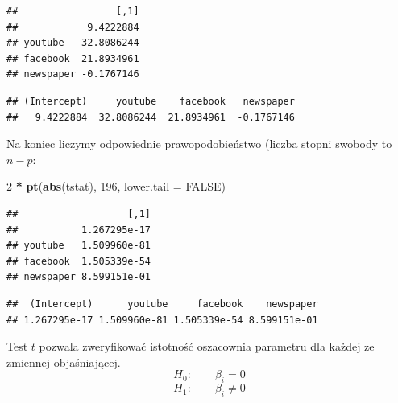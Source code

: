 \documentclass[]{article}
\newenvironment{Shaded}{\begin{snugshade}}{\end{snugshade}}
\newcommand{\KeywordTok}[1]{\textcolor[rgb]{0.13,0.29,0.53}{\textbf{#1}}}
\newcommand{\DataTypeTok}[1]{\textcolor[rgb]{0.13,0.29,0.53}{#1}}
\newcommand{\DecValTok}[1]{\textcolor[rgb]{0.00,0.00,0.81}{#1}}
\newcommand{\StringTok}[1]{\textcolor[rgb]{0.31,0.60,0.02}{#1}}
\newcommand{\OtherTok}[1]{\textcolor[rgb]{0.56,0.35,0.01}{#1}}
\newcommand{\OperatorTok}[1]{\textcolor[rgb]{0.81,0.36,0.00}{\textbf{#1}}}
\newcommand{\NormalTok}[1]{#1}
\begin{document}
\begin{verbatim}
##                 [,1]
##            9.4222884
## youtube   32.8086244
## facebook  21.8934961
## newspaper -0.1767146
\end{verbatim}

\begin{Shaded}
\end{Shaded}

\begin{verbatim}
## (Intercept)     youtube    facebook   newspaper 
##   9.4222884  32.8086244  21.8934961  -0.1767146
\end{verbatim}

Na koniec liczymy odpowiednie prawopodobieństwo (liczba stopni swobody
to \(n-p\):

\begin{Shaded}
\begin{Highlighting}[]
\DecValTok{2} \OperatorTok{*}\StringTok{ }\KeywordTok{pt}\NormalTok{(}\KeywordTok{abs}\NormalTok{(tstat), }\DecValTok{196}\NormalTok{, }\DataTypeTok{lower.tail =} \OtherTok{FALSE}\NormalTok{)}
\end{Highlighting}
\end{Shaded}

\begin{verbatim}
##                   [,1]
##           1.267295e-17
## youtube   1.509960e-81
## facebook  1.505339e-54
## newspaper 8.599151e-01
\end{verbatim}

\begin{Shaded}
\end{Shaded}

\begin{verbatim}
##  (Intercept)      youtube     facebook    newspaper 
## 1.267295e-17 1.509960e-81 1.505339e-54 8.599151e-01
\end{verbatim}

Test \(t\) pozwala zweryfikować istotność oszacownia parametru dla
każdej ze zmiennej objaśniającej. \[H_0: \qquad \beta_i=0\]
\[H_1: \qquad \beta_i\neq 0\]
\end{document}
